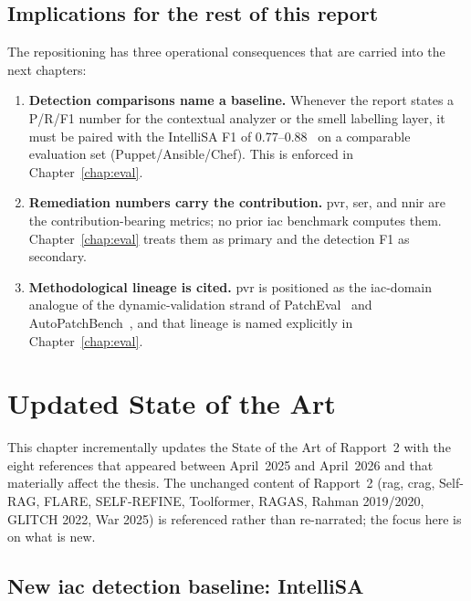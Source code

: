\documentclass[12pt, a4paper]{report}
\begin{document}
\section{Implications for the rest of this report}

The repositioning has three operational consequences that are carried into
the next chapters:

\begin{enumerate}
  \item \textbf{Detection comparisons name a baseline.} Whenever the report
        states a P/R/F1 number for the contextual analyzer or the smell
        labelling layer, it must be paired with the IntelliSA F1 of
        0.77--0.88~\citep{intellisa2026} on a comparable evaluation set
        (Puppet/Ansible/Chef). This is enforced in Chapter~\ref{chap:eval}.
  \item \textbf{Remediation numbers carry the contribution.} \gls{pvr},
        \gls{ser}, and \gls{nnir} are the contribution-bearing metrics; no
        prior \gls{iac} benchmark computes them.
        Chapter~\ref{chap:eval} treats them as primary and the detection
        F1 as secondary.
  \item \textbf{Methodological lineage is cited.} \gls{pvr} is positioned
        as the \gls{iac}-domain analogue of the dynamic-validation strand of
        PatchEval~\citep{lyu2024patcheval} and
        AutoPatchBench~\citep{autopatchbench2025}, and that lineage is named
        explicitly in Chapter~\ref{chap:eval}.
\end{enumerate}

\chapter{Updated State of the Art}
\label{chap:sota}

This chapter incrementally updates the State of the Art of Rapport~2 with
the eight references that appeared between April~2025 and April~2026 and
that materially affect the thesis. The unchanged content of Rapport~2
(\gls{rag}, \gls{crag}, Self-RAG, FLARE, SELF-REFINE, Toolformer, RAGAS,
Rahman 2019/2020, GLITCH 2022, War 2025) is referenced rather than
re-narrated; the focus here is on what is new.

\section{New \gls{iac} detection baseline: IntelliSA}
\end{document}
